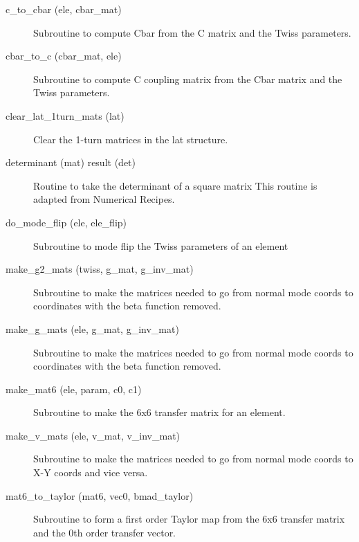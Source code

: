\begin{description}

\label{r:c.to.cbar}
\item[c_to_cbar (ele, cbar_mat)] \Newline
Subroutine to compute Cbar from the C matrix and the Twiss parameters. 

\label{r:cbar.to.c}
\item[cbar_to_c (cbar_mat, ele)] \Newline
Subroutine to compute C coupling matrix from the Cbar matrix and the Twiss parameters. 

\label{r:clear.lat.1turn.mats}
\item[clear_lat_1turn_mats (lat)] \Newline
Clear the 1-turn matrices in the lat structure. 

\label{r:determinant}
\item[determinant (mat) result (det)] \Newline 
Routine to take the determinant of a square matrix
This routine is adapted from Numerical Recipes.

\label{r:do.mode.flip}
\item[do_mode_flip (ele, ele_flip)] \Newline
Subroutine to mode flip the Twiss parameters of an element 

\label{r:make.g2.mats}
\item[make_g2_mats (twiss, g_mat, g_inv_mat)] \Newline
Subroutine to make the matrices needed to go from normal mode coords to 
coordinates with the beta function removed. 

\label{r:make.g.mats}
\item[make_g_mats (ele, g_mat, g_inv_mat)] \Newline
Subroutine to make the matrices needed to go from normal mode coords to 
coordinates with the beta function removed. 

\label{r:make.mat6}
\item[make_mat6 (ele, param, c0, c1)] \Newline
Subroutine to make the 6x6 transfer matrix for an element. 

\label{r:make.v.mats}
\item[make_v_mats (ele, v_mat, v_inv_mat)] \Newline
Subroutine to make the matrices needed to go from normal mode coords to X-Y 
coords and vice versa. 

\label{r:mat6.to.taylor}
\item[mat6_to_taylor (mat6, vec0, bmad_taylor)] \Newline
Subroutine to form a first order Taylor map from the 6x6 transfer matrix 
and the 0th order transfer vector. 


\end{description}
